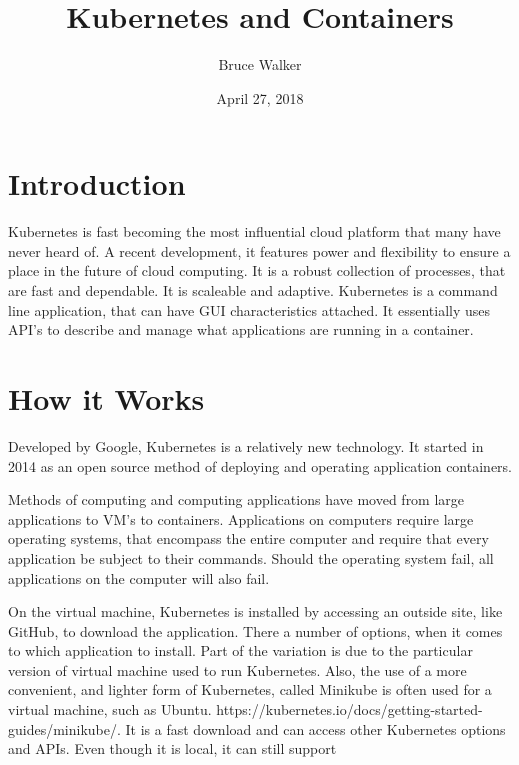 
\title{Kubernetes and Containers}
\author{Bruce Walker}

 
\date{ April 27, 2018}

\maketitle 

\section{Introduction}

Kubernetes is fast becoming the most influential cloud platform that
many have never heard of.  A recent development, it features power and
flexibility to ensure a place in the future of cloud computing.  It is
a robust collection of processes, that are fast and dependable.  It is
scaleable and adaptive. Kubernetes is a command line application, that
can have GUI characteristics attached.  It essentially uses API's to
describe and manage what applications are running in a container.
\cite {hid-sp18-525-concept}

\section{How it Works}

Developed by Google, Kubernetes is a relatively new technology.  It
started in 2014 as an open source method of deploying and operating
application containers.  

Methods of computing and computing applications have moved from large
applications to VM's to containers.  Applications on computers require
large operating systems, that encompass the entire computer and
require that every application be subject to their commands.  Should
the operating system fail, all applications on the computer will also
fail.   

On the virtual machine, Kubernetes is installed by accessing an
outside site, like GitHub, to download the application.  There a
number of options, when it comes to which application to install.
Part of the variation is due to the particular version of virtual
machine used to run Kubernetes.  Also, the use of a more convenient,
and lighter form of Kubernetes, called Minikube is often used for a
virtual machine, such as
Ubuntu. https://kubernetes.io/docs/getting-started-guides/minikube/.
It is a fast download and can access other Kubernetes options and
APIs.  Even though it is local, it can still
support~\cite{hid-sp18-525-concept}

